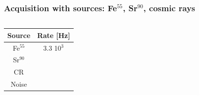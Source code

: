     \begin{frame}
        \frametitle{Acquisition with sources: Fe$^{55}$, Sr$^{90}$, cosmic rays}
        \begin{columns}
                \begin{table}
                    \tiny
                    \begin{center}
                    \begin{tabular}{|c | c |}
                    \hline
                    Source & Rate [\si{Hz}]\\
                    \hline
                    \hline
                    Fe$^{55}$ & 3.3 10$^3$\\
                    Sr$^{90}$ & \\
                    CR & \\
                    Noise &  \\
                    \hline
                    \end{tabular}
                    \end{center}
                \end{table}


\end{columns}
\end{frame}
